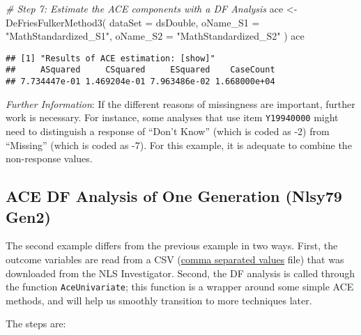 \documentclass[smallextended]{svjour3}       %
\newenvironment{Shaded}{\begin{snugshade}}{\end{snugshade}}
\newcommand{\AttributeTok}[1]{\textcolor[rgb]{0.77,0.63,0.00}{#1}}
\newcommand{\CommentTok}[1]{\textcolor[rgb]{0.56,0.35,0.01}{\textit{#1}}}
\newcommand{\FunctionTok}[1]{\textcolor[rgb]{0.00,0.00,0.00}{#1}}
\newcommand{\NormalTok}[1]{#1}
\newcommand{\OtherTok}[1]{\textcolor[rgb]{0.56,0.35,0.01}{#1}}
\newcommand{\StringTok}[1]{\textcolor[rgb]{0.31,0.60,0.02}{#1}}
\begin{document}
\begin{Shaded}
\begin{Highlighting}[]
\CommentTok{\# Step 7: Estimate the ACE components with a DF Analysis}
\NormalTok{ace }\OtherTok{\textless{}{-}}
  \FunctionTok{DeFriesFulkerMethod3}\NormalTok{(}
    \AttributeTok{dataSet  =}\NormalTok{ dsDouble,}
    \AttributeTok{oName\_S1 =} \StringTok{"MathStandardized\_S1"}\NormalTok{,}
    \AttributeTok{oName\_S2 =} \StringTok{"MathStandardized\_S2"}
\NormalTok{  )}
\NormalTok{ace}
\end{Highlighting}
\end{Shaded}

\begin{verbatim}
## [1] "Results of ACE estimation: [show]"
##     ASquared     CSquared     ESquared    CaseCount 
## 7.734447e-01 1.469204e-01 7.963486e-02 1.668000e+04
\end{verbatim}

\emph{Further Information}: If the different reasons of missingness are
important, further work is necessary. For instance, some analyses that
use item \texttt{Y19940000} might need to distinguish a response of
``Don't Know'' (which is coded as -2) from ``Missing'' (which is coded
as -7). For this example, it is adequate to combine the non-response
values.

\hypertarget{ace-df-analysis-of-one-generation-nlsy79-gen2}{%
\subsection{ACE DF Analysis of One Generation (Nlsy79
Gen2)}\label{ace-df-analysis-of-one-generation-nlsy79-gen2}}

The second example differs from the previous example in two ways. First,
the outcome variables are read from a CSV
(\href{https://en.wikipedia.org/wiki/Comma-separated_values}{comma
separated values} file) that was downloaded from the NLS Investigator.
Second, the DF analysis is called through the function
\texttt{AceUnivariate}; this function is a wrapper around some simple
ACE methods, and will help us smoothly transition to more techniques
later.

The steps are:
\end{document}
